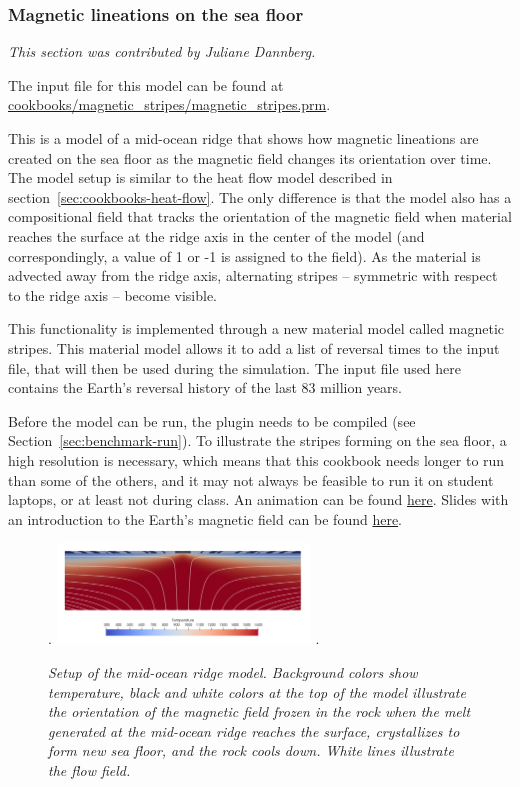 \subsubsection{Magnetic lineations on the sea floor}
\label{sec:cookbooks-magnetic-stripes}
\textit{This section was contributed by Juliane Dannberg.}

The input file for this model can be found at \url{cookbooks/magnetic_stripes/magnetic_stripes.prm}.

This is a model of a mid-ocean ridge that shows how magnetic lineations 
are created on the sea floor as the magnetic field changes its orientation over time.
The model setup is similar to the heat flow model described in section~\ref{sec:cookbooks-heat-flow}. 
The only difference is that the model also has a compositional field that tracks the orientation of the
magnetic field when material reaches the surface at the ridge axis in the center of the model 
(and correspondingly, a value of 1 or -1 is assigned to the field). As the material is advected 
away from the ridge axis, alternating stripes -- symmetric with respect to the ridge axis -- become visible. 

This functionality is implemented through a new material model called magnetic stripes. 
This material model allows it to add a list of reversal times to the input file, that will then be used during the 
simulation. The input file used here contains the Earth's reversal history of the last 83 million years. 

Before the model can be run, the plugin needs to be compiled (see Section~\ref{sec:benchmark-run}). 
To illustrate the stripes forming on the sea floor, a high resolution is necessary, which means that this
cookbook needs longer to run than some of the others, and it may not always be feasible to run it on student laptops, 
or at least not during class. An animation can be found \href{https://www.youtube.com/watch?v=KeHNhWLL7ws}{here}.
Slides with an introduction to the Earth's magnetic field can be found \href{https://www.dropbox.com/s/2kkw3ce2muvn4nh/08_geophysics_lecture_02_05.pdf?dl=0}{here}.

\begin{figure}[h]
\phantom.
\hfill
\includegraphics[width=0.6\textwidth]{cookbooks/magnetic_stripes/doc/mid-ocean-ridge.png}
\hfill
\phantom.
\caption{\it Setup of the mid-ocean ridge model. Background colors show temperature, black and white colors at the top of the model illustrate the orientation of the magnetic field frozen in the rock when the melt generated at the mid-ocean ridge reaches the surface, crystallizes to form new sea floor, and the rock cools down. White lines illustrate the flow field.}
\label{fig:convection-box-iterations}
\end{figure}





